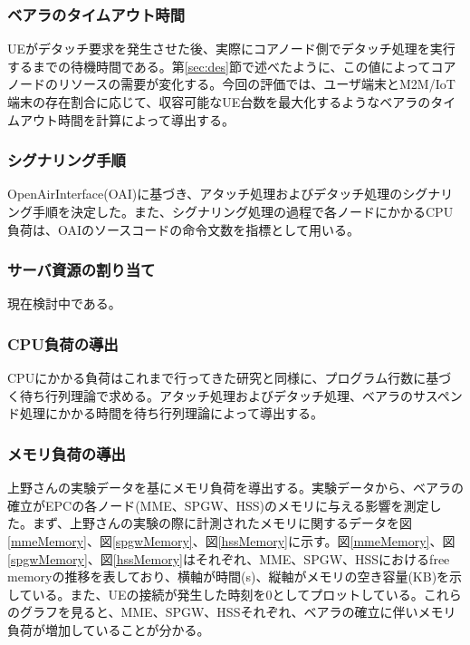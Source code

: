 \documentclass[a4j]{ujarticle}
\begin{document}
\subsubsection{ベアラのタイムアウト時間}
UEがデタッチ要求を発生させた後、実際にコアノード側でデタッチ処理を実行するまでの待機時間である。第\ref{sec:des}節で述べたように、この値によってコアノードのリソースの需要が変化する。今回の評価では、ユーザ端末とM2M/IoT端末の存在割合に応じて、収容可能なUE台数を最大化するようなベアラのタイムアウト時間を計算によって導出する。


\subsubsection{シグナリング手順}
OpenAirInterface(OAI)\cite{OpenAirInterface}に基づき、アタッチ処理およびデタッチ処理のシグナリング手順を決定した。また、シグナリング処理の過程で各ノードにかかるCPU負荷は、OAIのソースコードの命令文数を指標として用いる。
\subsubsection{サーバ資源の割り当て}
現在検討中である。

\subsubsection{CPU負荷の導出}
CPUにかかる負荷はこれまで行ってきた研究と同様に、プログラム行数に基づく待ち行列理論で求める。アタッチ処理およびデタッチ処理、ベアラのサスペンド処理にかかる時間を待ち行列理論によって導出する。

\subsubsection{メモリ負荷の導出}
上野さんの実験データを基にメモリ負荷を導出する。実験データから、ベアラの確立がEPCの各ノード(MME、SPGW、HSS)のメモリに与える影響を測定した。まず、上野さんの実験の際に計測されたメモリに関するデータを図\ref{mmeMemory}、図\ref{spgwMemory}、図\ref{hssMemory}に示す。図\ref{mmeMemory}、図\ref{spgwMemory}、図\ref{hssMemory}はそれぞれ、MME、SPGW、HSSにおけるfree memoryの推移を表しており、横軸が時間(s)、縦軸がメモリの空き容量(KB)を示している。また、UEの接続が発生した時刻を0としてプロットしている。これらのグラフを見ると、MME、SPGW、HSSそれぞれ、ベアラの確立に伴いメモリ負荷が増加していることが分かる。
\end{document}
